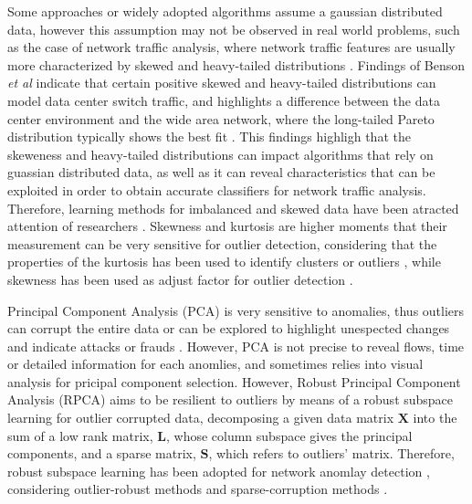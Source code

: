 \documentclass[review]{elsarticle}
\begin{document}
Some approaches or widely adopted algorithms assume a gaussian distributed data, however this assumption may not be observed in real world problems, such as the case of network traffic analysis, where network traffic features are usually more characterized by skewed and heavy-tailed distributions \cite{lakhina2005mining,benson2010network}. Findings of Benson \emph{et al}  \cite{benson2010network} indicate that certain positive skewed and heavy-tailed distributions can model data center switch traffic, and highlights a difference between the data center environment and the wide area network, where the long-tailed Pareto distribution typically shows the best fit \cite{benson2010network}. This findings highligh that the skeweness and heavy-tailed distributions can impact algorithms that rely on guassian distributed data, as well as it can reveal characteristics that can be exploited in order to obtain accurate classifiers for network traffic analysis. Therefore, learning methods for imbalanced and skewed data have been atracted attention of researchers \cite{Phua2004minority,hubert2009robustskewed}. Skewness and kurtosis are higher moments that their measurement can be very sensitive for outlier detection, considering that the properties of the kurtosis has been used to identify clusters or outliers \cite{pena2010eigenvectors}, while skewness has been used as adjust factor for outlier detection \cite{hubert2009robustskewed}.

Principal Component Analysis (PCA) is very sensitive to anomalies, thus outliers can corrupt the entire data or can be explored to highlight unespected changes and indicate attacks or frauds \cite{callegari2011novel,Lee2013,vieira2017model}. However, PCA is not precise to reveal flows, time or detailed information for each anomlies, and sometimes relies into visual analysis for pricipal component selection. However, Robust Principal Component Analysis (RPCA) \cite{candes2011robust} aims to be resilient to outliers by means of a robust subspace learning \cite{vaswani2018robust} for outlier corrupted data, decomposing a given data matrix $\textbf{X}$ into the sum of a low rank matrix, $\textbf{L}$, whose column subspace gives the principal components, and a sparse matrix, $\textbf{S}$, which refers to outliers’ matrix. Therefore, robust subspace learning has been adopted for network anomlay detection \cite{rousseeuw1984mcd, rousseeuw1999fastmcd, hubert2005robpca,hubert2009robustskewed, pascoal2012robust, zhou2017anomaly}, considering outlier-robust methods and sparse-corruption methods \cite{lerman2018overview}.
\end{document}
